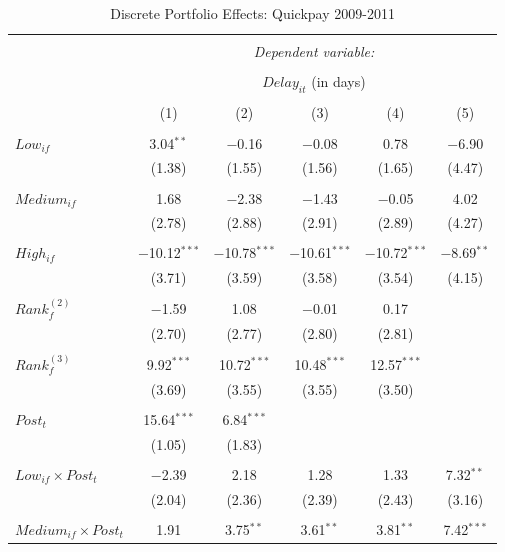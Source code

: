 \documentclass[
]{article}
\begin{document}
\begin{table}[H] \centering 
  \caption{Discrete Portfolio Effects: Quickpay 2009-2011} 
  \label{} 
\small 
\begin{tabular}{@{\extracolsep{-2pt}}lccccc} 
\\[-1.8ex]\hline 
\hline \\[-1.8ex] 
 & \multicolumn{5}{c}{\textit{Dependent variable:}} \\ 
\cline{2-6} 
\\[-1.8ex] & \multicolumn{5}{c}{$Delay_{it}$ (in days)} \\ 
\\[-1.8ex] & (1) & (2) & (3) & (4) & (5)\\ 
\hline \\[-1.8ex] 
 $Low_{if}$ & 3.04$^{**}$ & $-$0.16 & $-$0.08 & 0.78 & $-$6.90 \\ 
  & (1.38) & (1.55) & (1.56) & (1.65) & (4.47) \\ 
  & & & & & \\ 
 $Medium_{if}$ & 1.68 & $-$2.38 & $-$1.43 & $-$0.05 & 4.02 \\ 
  & (2.78) & (2.88) & (2.91) & (2.89) & (4.27) \\ 
  & & & & & \\ 
 $High_{if}$ & $-$10.12$^{***}$ & $-$10.78$^{***}$ & $-$10.61$^{***}$ & $-$10.72$^{***}$ & $-$8.69$^{**}$ \\ 
  & (3.71) & (3.59) & (3.58) & (3.54) & (4.15) \\ 
  & & & & & \\ 
 $Rank_f^{(2)}$ & $-$1.59 & 1.08 & $-$0.01 & 0.17 &  \\ 
  & (2.70) & (2.77) & (2.80) & (2.81) &  \\ 
  & & & & & \\ 
 $Rank_f^{(3)}$ & 9.92$^{***}$ & 10.72$^{***}$ & 10.48$^{***}$ & 12.57$^{***}$ &  \\ 
  & (3.69) & (3.55) & (3.55) & (3.50) &  \\ 
  & & & & & \\ 
 $Post_t$ & 15.64$^{***}$ & 6.84$^{***}$ &  &  &  \\ 
  & (1.05) & (1.83) &  &  &  \\ 
  & & & & & \\ 
 $Low_{if} \times Post_t$ & $-$2.39 & 2.18 & 1.28 & 1.33 & 7.32$^{**}$ \\ 
  & (2.04) & (2.36) & (2.39) & (2.43) & (3.16) \\ 
  & & & & & \\ 
 $Medium_{if} \times Post_t$ & 1.91 & 3.75$^{**}$ & 3.61$^{**}$ & 3.81$^{**}$ & 7.42$^{***}$ \\ 

\end{tabular}
\end{table}
\end{document}
